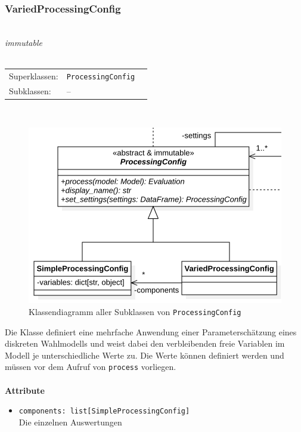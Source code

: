 \documentclass{article}
\begin{document}
\subsubsection*{\large{\textbf{VariedProcessingConfig}\label{cls:VariedProcessingConfig}}}\\
\textit{\flqq{}immutable\frqq}\normalsize\\\\
\begin{tabular}{lll}
 Superklassen: & \texttt{ProcessingConfig}\\
 Subklassen: & --
\end{tabular}\\
\begin{figure}[H]%
    \centering
    \includegraphics[width=13cm]{entwurf/Entwurf_dokument/img/cls/ProcessingConfigs.png}
    \caption{Klassendiagramm aller Subklassen von \texttt{ProcessingConfig}}
\end{figure}

Die Klasse definiert eine mehrfache Anwendung einer Parameterschätzung eines diskreten Wahlmodells und weist dabei den verbleibenden freie Variablen im Modell je unterschiedliche Werte zu. Die Werte können definiert werden und müssen vor dem Aufruf von \texttt{process} vorliegen.
\\\\

\textbf{{Attribute}}
\begin{itemize}\setlength\itemsep{3em}
\item \texttt{components: list[SimpleProcessingConfig]}\\
Die einzelnen Auswertungen 
\\\\
\end{itemize}
\end{document}
